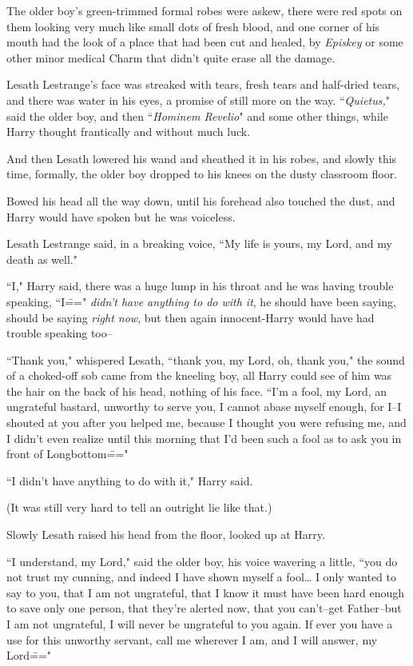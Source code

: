 The older boy's green-trimmed formal robes were askew, there were red spots on them looking very much like small dots of fresh blood, and one corner of his mouth had the look of a place that had been cut and healed, by \emph{Episkey} or some other minor medical Charm that didn't quite erase all the damage.

Lesath Lestrange's face was streaked with tears, fresh tears and half-dried tears, and there was water in his eyes, a promise of still more on the way. ``\emph{Quietus,}" said the older boy, and then ``\emph{Hominem Revelio}" and some other things, while Harry thought frantically and without much luck.

And then Lesath lowered his wand and sheathed it in his robes, and slowly this time, formally, the older boy dropped to his knees on the dusty classroom floor.

Bowed his head all the way down, until his forehead also touched the dust, and Harry would have spoken but he was voiceless.

Lesath Lestrange said, in a breaking voice, ``My life is yours, my Lord, and my death as well."

``I," Harry said, there was a huge lump in his throat and he was having trouble speaking, ``I\===" \emph{didn't have anything to do with it}, he should have been saying, should be saying \emph{right now}, but then again innocent-Harry would have had trouble speaking too\---

``Thank you," whispered Lesath, ``thank you, my Lord, oh, thank you," the sound of a choked-off sob came from the kneeling boy, all Harry could see of him was the hair on the back of his head, nothing of his face. ``I'm a fool, my Lord, an ungrateful bastard, unworthy to serve you, I cannot abase myself enough, for I\---I shouted at you after you helped me, because I thought you were refusing me, and I didn't even realize until this morning that I'd been such a fool as to ask you in front of Longbottom\==="

``I didn't have anything to do with it," Harry said.

(It was still very hard to tell an outright lie like that.)

Slowly Lesath raised his head from the floor, looked up at Harry.

``I understand, my Lord," said the older boy, his voice wavering a little, ``you do not trust my cunning, and indeed I have shown myself a fool{\ldots} I only wanted to say to you, that I am not ungrateful, that I know it must have been hard enough to save only one person, that they're alerted now, that you can't\---get Father\---but I am not ungrateful, I will never be ungrateful to you again. If ever you have a use for this unworthy servant, call me wherever I am, and I will answer, my Lord\==="

